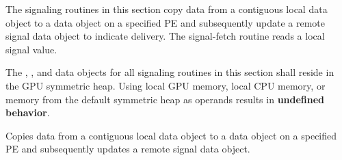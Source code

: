 
The signaling routines in this section copy data from a contiguous local data
object to a data object on a specified \ac{PE} and subsequently update a remote
signal data object to indicate delivery. The signal-fetch routine reads a local
signal value.

The , , and  data objects for all signaling
routines in this section shall reside in the \ac{GPU} symmetric heap. Using local
\ac{GPU} memory, local CPU memory, or memory from the default symmetric heap as
operands results in \textbf{undefined behavior}.

\label{subsec:gc_put_signal}

Copies data from a contiguous local data object to a data object on a specified
\ac{PE} and subsequently updates a remote signal data object.

